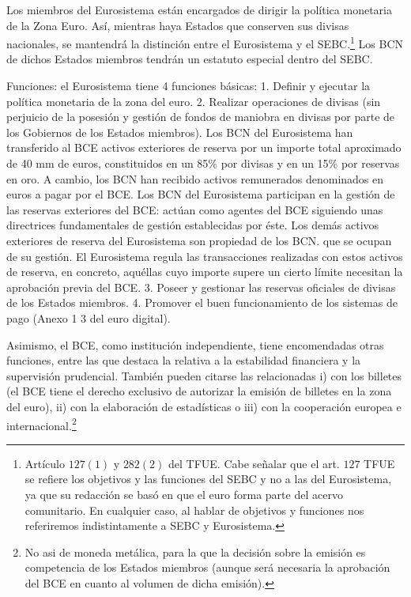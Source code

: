 \documentclass[10pt,a4paper]{article}
\begin{document}
{Los miembros del Eurosistema están encargados de dirigir la política monetaria de la Zona Euro. Así, mientras haya Estados que conserven sus divisas nacionales, se mantendrá la distinción entre el Eurosistema y el SEBC.\footnote{%
    Artículo $127(1)$ y $282(2)$ del TFUE. Cabe señalar que el art. $127$ TFUE se refiere los objetivos y las funciones del SEBC y no a las del Eurosistema, ya que su redacción se basó en que el euro forma parte del acervo comunitario. En cualquier caso, al hablar de objetivos y funciones nos referiremos indistintamente a SEBC y Eurosistema.
} Los BCN de dichos Estados miembros tendrán un estatuto especial dentro del SEBC. 








Funciones: 
el Eurosistema tiene 4 funciones básicas: 
1. Definir y ejecutar la política monetaria de la zona del euro. 
2. Realizar operaciones de divisas (sin perjuicio de la posesión y gestión de fondos de maniobra en divisas por parte de los Gobiernos de los Estados miembros). Los BCN del Eurosistema han transferido al BCE activos exteriores de reserva por un importe total aproximado de 40 mm de euros, constituidos en un 85\% por divisas y en un 15\% por reservas en oro. A cambio, los BCN han recibido activos remunerados denominados en euros a pagar por el BCE. Los BCN del Eurosistema participan en la gestión de las reservas exteriores del BCE: actúan como agentes del BCE siguiendo unas directrices fundamentales de gestión establecidas por éste. Los demás activos exteriores de reserva del Eurosistema son propiedad de los BCN. que se ocupan de su gestión. El Eurosistema regula las transacciones realizadas con estos activos de reserva, en concreto, aquéllas cuyo importe supere un cierto límite necesitan la aprobación previa del BCE.
3. Poseer y gestionar las reservas oficiales de divisas de los Estados miembros.
4. Promover el buen funcionamiento de los sistemas de pago (Anexo 1 3 del euro digital). 

Asimismo, el BCE, como institución independiente, tiene encomendadas otras funciones, entre las que destaca la relativa a la estabilidad financiera y la supervisión prudencial. También pueden citarse las relacionadas i) con los billetes (el BCE tiene el derecho exclusivo de autorizar la emisión de billetes en la zona del euro), ii) con la elaboración de estadísticas o iii) con la cooperación europea e internacional.\footnote{%
    No asi de moneda metálica, para la que la decisión sobre la emisión es competencia de los Estados miembros (aunque será necesaria la aprobación del BCE en cuanto al volumen de dicha emisión).
}

}
\end{document}
